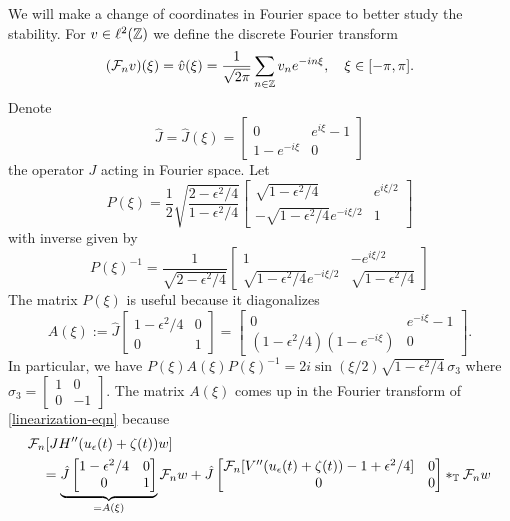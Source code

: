 We will make a change of coordinates in Fourier space to better study the stability. For \(v \in \ell^2(\mathbb{Z})\) we define the discrete Fourier transform
\begin{equation}
	(\mathcal{F}_n v)(\xi) = \hat v (\xi) = \frac 1 {\sqrt {2\pi}} \sum_{n\in \mathbb{Z}} v_n e^{-in \xi}, \quad \xi\in[-\pi, \pi].
\end{equation}
Denote
\begin{equation}
	\hat J = \hat J(\xi) = \begin{bmatrix}
		0 & e^{i\xi} - 1 \\
		1 - e^{-i\xi} & 0
	\end{bmatrix}
\end{equation}
the operator \(J\) acting in Fourier space. Let 
\begin{equation}
	P(\xi) = \frac 1 2 \sqrt{\frac{2 - \epsilon^2/4}{1 - \epsilon^2/4}} \begin{bmatrix}
		\sqrt{1-\epsilon^2/4} & e^{i\xi/2} \\
		-\sqrt{1-\epsilon^2/4} e^{-i\xi/2} & 1
	\end{bmatrix}
\end{equation}
with inverse given by 
\begin{equation}
	P(\xi)^{-1} = \frac 1 {\sqrt{2-\epsilon^2/4}} \begin{bmatrix}
		1 & - e^{i\xi/2} \\
		\sqrt{1-\epsilon^2/4}  e^{-i\xi /2} & \sqrt{1-\epsilon^2 /4}
	\end{bmatrix}
\end{equation}
The matrix \(P(\xi)\) is useful because it diagonalizes 
\begin{equation}
	A(\xi) := \hat J  \begin{bmatrix}
		1 - \epsilon^2/4 & 0 \\
		0 & 1
	\end{bmatrix} = \begin{bmatrix}
		0 & e^{-i\xi} -  1 \\
		(1-\epsilon^2 /4)(1-e^{-i\xi}) & 0
	\end{bmatrix}.
\end{equation}
In particular, we have \(P(\xi) A(\xi) P(\xi)^{-1} = 2i \sin(\xi/2) \sqrt{1-\epsilon^2/4}\, \sigma_3\) where \(\sigma_3 = \begin{bmatrix}
	1 & 0 \\ 0 & -1
\end{bmatrix}\).
The matrix \(A(\xi)\) comes up in the Fourier transform of \cref{linearization-eqn} because
\begin{equation}
	\begin{aligned}
	&\mathcal{F}_n[ JH''(u_\epsilon(t) + \zeta(t)) w]\\
	&\quad = \underbrace{\hat J \begin{bmatrix}
			1-\epsilon^2/4 & 0 \\
			0 & 1
	\end{bmatrix}}_{=A(\xi)} \mathcal{F}_n w + \hat J\begin{bmatrix}
		\mathcal{F}_n [V''(u_\epsilon(t) + \zeta(t)) - 1 + \epsilon^2 /4 ]& 0 \\
		0 & 0 
	\end{bmatrix} *_{\mathbb T} \mathcal{F}_n w
	\end{aligned}
\end{equation} 
